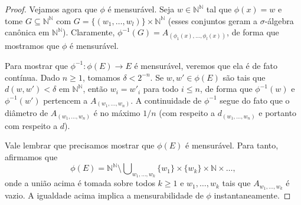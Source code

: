 \documentclass[reqno, draft]{book}
\newcommand*\1{\mathds{1}}
\DeclareMathOperator*{\mcup}{{\textstyle \bigcup}}
\begin{document}
\begin{proof}
  Vejamos agora que $\phi$ é mensurável.
  Seja $w \in \mathbb{N}^\mathbb{N}$ tal que $\phi(x) = w$ e tome $G \subseteq \mathbb{N}^\mathbb{N}$ com $G = \{(w_1, \dots, w_l)\} \times \mathbb{N}^\mathbb{N}$ (esses conjuntos geram a $\sigma$-álgebra canônica em $\mathbb{N}^\mathbb{N}$).
  Claramente, $\phi^{-1}(G) = A_{(\phi_1(x), \dots, \phi_l(x))}$, de forma que mostramos que $\phi$ é mensurável.

  Para mostrar que $\phi^{-1}:\phi(E) \to E$ é mensurável, veremos que ela é de fato contínua.
  Dado $n \geq 1$, tomamos $\delta < 2^{-n}$.
  Se $w, w' \in \phi(E)$ são tais que $d(w, w') < \delta$ em $\mathbb{N}^\mathbb{N}$, então $w_i = w'_i$ para todo $i \leq n$, de forma que $\phi^{-1}(w)$ e $\phi^{-1}(w')$ pertencem a $A_{(w_1, \dots, w_n)}$.
  A continuidade de $\phi^{-1}$ segue do fato que o diâmetro de $A_{(w_1, \dots, w_n)}$ é no máximo $1/n$ (com respeito a $d_{(w_1, \dots, w_n)}$ e portanto com respeito a $d$).

  Vale lembrar que precisamos mostrar que $\phi(E)$ é mensurável.
  Para tanto, afirmamos que
  \begin{equation}
    \label{e:phiE_mensur}
    \phi(E) = \mathbb{N}^\mathbb{N} \setminus \mcup_{w_1, \dots, w_k} \{w_1\} \times \{w_k\} \times \mathbb{N} \times \dots,
  \end{equation}
  onde a união acima é tomada sobre todos $k \geq 1$ e $w_1, \dots, w_k$ tais que $A_{w_1, \dots, w_k}$ é vazio.
  A igualdade acima implica a mensurabilidade de $\phi$ instantaneamente.


\end{proof}
\end{document}
